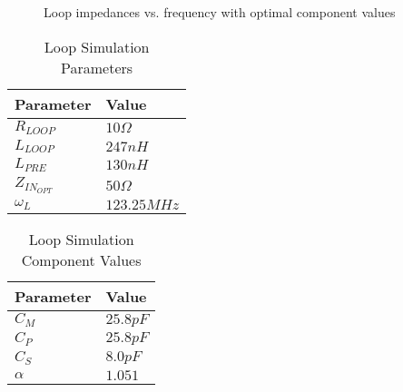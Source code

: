 \newpage
\begin{figure}
    \centering
    
    \caption{Loop impedances vs. frequency with optimal component values}
    \label{fig:impedance_plot}
\end{figure}

\begin{table}[]
\centering
\caption{Loop Simulation Parameters}
\label{tab:sim_independent}
\begin{tabular}{|l|l|}
\hline
Parameter  & Value       \\
\hline
$R_{LOOP}$ & $10\Omega$  \\
$L_{LOOP}$ & $247nH$     \\
$L_{PRE}$  & $130nH$     \\
    $Z_{IN_{OPT}}$  & $50\Omega$     \\
$\omega_L$ & $123.25MHz$ \\
\hline
\end{tabular}
\end{table}

\begin{table}[]
\centering
\caption{Loop Simulation Component Values}
\label{tab:sim_dependent}
\begin{tabular}{|l|l|}
\hline
Parameter & Value       \\
\hline
$C_M$     & $25.8pF$  \\
$C_P$     & $25.8pF$     \\
$C_S$     & $8.0pF$     \\
$\alpha$  & $1.051$ \\
\hline
\end{tabular}
\end{table}
